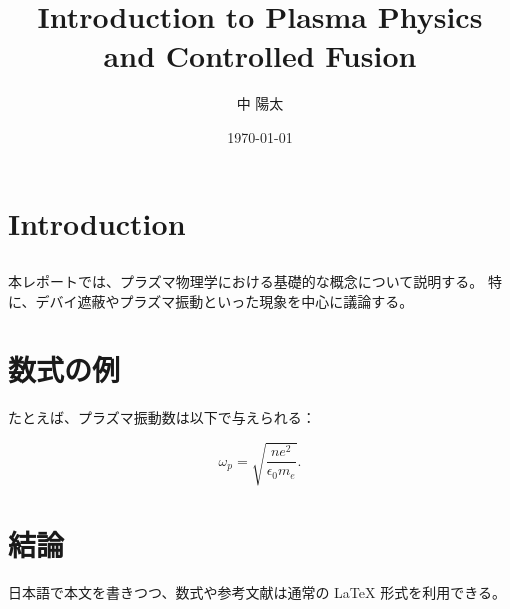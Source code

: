 \documentclass[a4paper,12pt]{article}
\title{Introduction to Plasma Physics and Controlled Fusion}
\author{中 陽太}
\date{\today}
\begin{document}
\maketitle
\section{Introduction}
\subsection{}
本レポートでは、プラズマ物理学における基礎的な概念について説明する。
特に、デバイ遮蔽やプラズマ振動といった現象を中心に議論する。

\section{数式の例}
たとえば、プラズマ振動数は以下で与えられる：

\[
\omega_p = \sqrt{\frac{n e^2}{\epsilon_0 m_e}}.
\]

\section{結論}
日本語で本文を書きつつ、数式や参考文献は通常の LaTeX 形式を利用できる。
\end{document}
